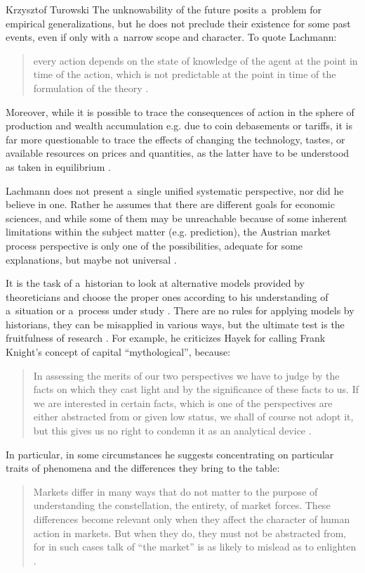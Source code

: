 \begin{artengenv}{Krzysztof Turowski}
The unknowability of the future posits a~problem for empirical generalizations, but he does not preclude their existence for some past events, even if only with a~narrow scope and character. To quote Lachmann:
\begin{quote}
every action depends on the state of knowledge of the agent at the point in time of the action, which is not predictable at the point in time of the formulation of the theory \parencite[61]{lachmann-significance}.
\end{quote}
Moreover, while it is possible to trace the consequences of action in the sphere of production and wealth accumulation e.g. due to coin debasements or tariffs, it is far more questionable to trace the effects of changing the technology, tastes, or available resources on prices and quantities, as the latter have to be understood as taken in equilibrium \parencite[32--33]{lachmann1986market}.

Lachmann does not present a~single unified systematic perspective, nor did he believe in one. Rather he assumes that there are different goals for economic sciences, and while some of them may be unreachable because of some inherent limitations within the subject matter (e.g. prediction), the Austrian market process perspective is only one of the possibilities, adequate for some explanations, but maybe not universal \parencite[41]{lachmann1986market}.

It is the task of a~historian to look at alternative models provided by theoreticians and choose the proper ones according to his understanding of a~situation or a~process under study \parencite[179]{lachmann-science}. There are no rules for applying models by historians, they can be misapplied in various ways, but the ultimate test is the fruitfulness of research \parencite[175]{lachmann-science}.
For example, he criticizes Hayek for calling Frank Knight's concept of capital ``mythological'', because:
\begin{quote}
In assessing the merits of our two perspectives we have to judge by the facts on which they cast light and by the significance of these facts to us. If we are interested in certain facts, which is one of the perspectives are either abstracted from or given low status, we shall of course not adopt it, but this gives us no right to condemn it as an analytical device \parencite[175]{lachmann-salvage}.
\end{quote}
In particular, in some circumstances he suggests concentrating on particular traits of phenomena and the differences they bring to the table:
\begin{quote}
Markets differ in many ways that do not matter to the purpose of understanding the constellation, the entirety, of market forces. These differences become relevant only when they affect the character of human action in markets. But when they do, they must not be abstracted from, for in such cases talk of ``the market'' is as likely to mislead as to enlighten \parencite[271]{lachmann-speculative-markets}.
\end{quote}


\end{artengenv}
